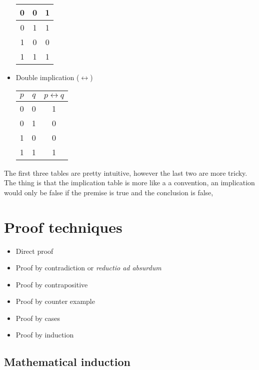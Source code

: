 \documentclass{report}
\begin{document}
\begin{itemize}
\begin{table}[h!]
\begin{tabular}{|c|c|c|}
            0   & 0   &  1   \\ \hline
            0   & 1   &  1   \\ \hline
            1   & 0   &  0   \\ \hline
            1   & 1   &  1   \\ \hline
            \end{tabular}
        \end{table}
        \item Double implication ($\leftrightarrow$)
        \begin{table}[h!]
            \centering
            \begin{tabular}{|c|c|c|}
            \hline
            $p$ & $q$ & $p \leftrightarrow q$ \\ \hline
            0   & 0   &  1   \\ \hline
            0   & 1   &  0   \\ \hline
            1   & 0   &  0   \\ \hline
            1   & 1   &  1   \\ \hline
            \end{tabular}
        \end{table}
    \end{itemize}

    The first three tables are pretty intuitive, however the last two are more tricky. The thing is that the implication table is more like a a convention, an implication would only be false if the premise is true and the conclusion is false,

    \section{Proof techniques}

    \begin{itemize}
        \item Direct proof
        \item Proof by contradiction or \textit{reductio ad absurdum}
        \item Proof by contrapositive
        \item Proof by counter example
        \item Proof by cases
        \item Proof by induction
    \end{itemize}

    \subsection*{Mathematical induction}
\end{document}

